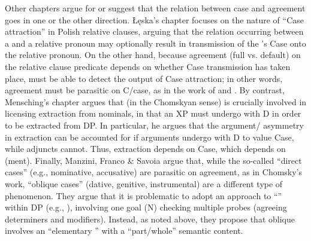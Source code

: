 \documentclass[output=paper]{langsci/langscibook}
\begin{document}
Other chapters argue for or suggest that the relation between case and agreement goes in one or the other direction. Łęska’s chapter focuses on the nature of ``Case attraction'' in Polish relative clauses, arguing that the  relation occurring between a   and a relative pronoun may optionally result in transmission of the  ’s Case onto the relative pronoun. On the other hand, because agreement (full vs. default) on the relative clause predicate depends on whether Case transmission has taken place,  must be able to detect the output of Case attraction; in other words, agreement must be parasitic on C\slash case, as in the work of \citet{Marantz1991} and \citet{Preminger2014}. By contrast, Mensching’s chapter argues that  (in the Chomskyan sense) is crucially involved in licensing extraction from nominals, in that an XP must undergo  with D in order to be extracted from DP. In particular, he argues that the argument\slash {} asymmetry in extraction can be accounted for if arguments undergo  with D to value Case, while adjuncts cannot. Thus, extraction depends on Case, which depends on (ment). Finally, Manzini, Franco \& Savoia argue that, while the so-called ``direct cases'' (e.g., nominative, accusative) are parasitic on agreement, as in Chomsky’s work, ``oblique cases'' (dative, genitive, instrumental) are a different type of phenomenon. They argue that it is problematic to adopt an  approach to ``'' within DP (e.g., \citealt{Carstens2001}), involving one goal (N) checking multiple probes (agreeing determiners and modifiers). Instead, as noted above, they propose that oblique involves an ``elementary '' with a ``part\slash whole'' semantic content.
\end{document}
